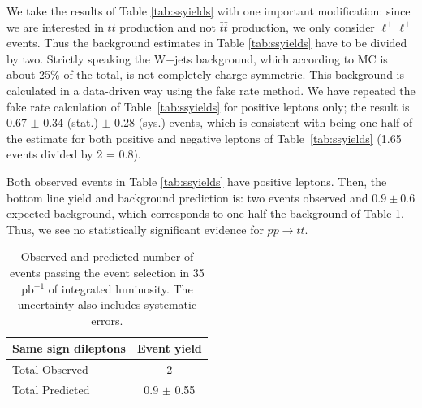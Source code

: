 We take the results of Table \ref{tab:ssyields} with one important modification: 
since we are interested in $tt$ production and not $\bar{t}\bar{t}$ production,
we only consider $\ell^{+}\ell^{+}$ events.  
Thus the background estimates in Table \ref{tab:ssyields} have to be divided by two.
Strictly speaking the W$+$jets background, which according to MC is about 25\%
of the total, is not completely charge symmetric.  
This background is calculated in a data-driven 
way using the fake rate method.  We have repeated the fake rate calculation
of Table~\ref{tab:ssyields} for positive leptons only; the result is 
0.67 $\pm$ 0.34 (stat.) $\pm$ 0.28 (sys.) events, which is consistent with being one half of the estimate for both
positive and negative leptons of Table~\ref{tab:ssyields}  (1.65 events divided
by 2 = 0.8).

Both observed events in Table \ref{tab:ssyields} have positive leptons.  
Then, the bottom line yield and background prediction is: 
two events observed and $0.9 \pm 0.6$ expected background, 
which corresponds to one half the background of Table \ref{tab:sm_preditcion}.
Thus, we see no statistically significant evidence for $pp \to tt$.





\begin{table}[hbt]
\begin{center}
\begin{tabular}{|l|c|}\hline
Same sign dileptons & Event yield \\ \hline
Total Observed & 2 \\
Total Predicted & 0.9 $\pm$ 0.55 \\
\hline
\end{tabular}
\caption{ Observed and predicted number of events passing the event selection in 35 pb$^{-1}$ of integrated luminosity. 
The uncertainty also includes systematic errors.\label{tab:sm_preditcion}}
\end{center}
\end{table}

